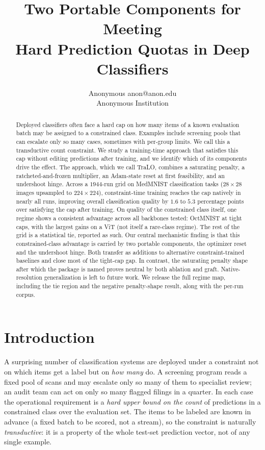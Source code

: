 \documentclass[10pt]{article}
\title{Two Portable Components for Meeting\\
Hard Prediction Quotas in Deep Classifiers}
\author{\name Anonymous \email anon@anon.edu \\
      \addr Anonymous Institution}
\begin{document}
\maketitle

\begin{abstract}
Deployed classifiers often face a hard cap on how many items of a known
evaluation batch may be assigned to a constrained class. Examples include
screening pools that can escalate only so many cases, sometimes with
per-group limits. We call this a transductive count constraint. We study
a training-time approach that satisfies this cap without editing
predictions after training, and we identify which of its components
drive the effect. The approach, which we call TraLO, combines a
saturating penalty, a ratcheted-and-frozen multiplier, an Adam-state
reset at first feasibility, and an undershoot hinge. Across a $1944$-run
grid on MedMNIST classification tasks ($28\times 28$ images upsampled to
$224\times 224$), constraint-time training reaches the cap natively in
nearly all runs, improving overall classification quality by $1.6$ to
$5.3$ percentage points over satisfying the cap after training. On
quality of the constrained class itself, one regime shows a consistent
advantage across all backbones tested: OctMNIST at tight caps, with the
largest gains on a ViT (not itself a rare-class regime). The rest of
the grid is a statistical tie, reported as such. Our central
mechanistic finding is that this constrained-class advantage is carried
by two portable components, the optimizer reset and the undershoot
hinge. Both transfer as additions to alternative constraint-trained
baselines and close most of the tight-cap gap. In contrast, the
saturating penalty shape after which the package is named proves neutral
by both ablation and graft. Native-resolution generalization is left to
future work. We release the full regime map, including the tie region
and the negative penalty-shape result, along with the per-run corpus.
\end{abstract}

\section{Introduction}
\label{sec:intro}

A surprising number of classification systems are deployed under a constraint
not on which items get a label but on \emph{how many} do. A screening program
reads a fixed pool of scans and may escalate only so many of them to
specialist review; an audit team can act on only so many flagged filings in a
quarter. In each case the operational requirement is a
\emph{hard upper bound on the count} of predictions in a constrained class over
the evaluation set. The items to be labeled are known in advance (a fixed
batch to be scored, not a stream), so the constraint is naturally
\emph{transductive}: it is a property of the whole test-set prediction vector,
not of any single example.
\end{document}
